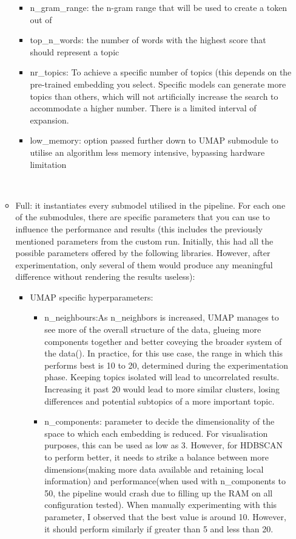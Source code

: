 \documentclass[12pt,MSc,a4paper,oneside]{muthesis}
\begin{document}
\begin{itemize}
\begin{itemize}
        \begin{itemize}
          \item n\_gram\_range: the n-gram range that will be used to create a token out of
          \item top\_n\_words: the number of words with the highest score that should represent a topic
          \item nr\_topics: To achieve a specific number of topics (this depends on the pre-trained embedding you select. Specific models can generate more topics than others, which will not artificially increase the search to accommodate a higher number. There is a limited interval of expansion.
            \item low\_memory: option passed further down to UMAP submodule to utilise an algorithm less memory intensive, bypassing hardware limitation
          \end{itemize}\\
        \item Full: it instantiates every submodel utilised in the pipeline. For each one of the submodules, there are specific parameters that you can use to influence the performance and results (this includes the previously mentioned parameters from the custom run. Initially, this had all the possible parameters offered by the following libraries. However, after experimentation, only several of them would produce any meaningful difference without rendering the results useless):
          \begin{itemize}
            \item UMAP specific hyperparameters:
              \begin{itemize}
                \item n\_neighbours:As n\_neighbors is increased, UMAP manages to see more of the overall structure of the data, glueing more components together and better coveying the broader system of the data(\cite{umap-parameters}). In practice, for this use case, the range in which this performs best is 10 to 20, determined during the experimentation phase. Keeping topics isolated will lead to uncorrelated results. Increasing it past 20 would lead to more similar clusters, losing differences and potential subtopics of a more important topic.
                \item n\_components: parameter to decide the dimensionality of the space to which each embedding is reduced. For visualisation purposes, this can be used as low as 3. However, for HDBSCAN to perform better, it needs to strike a balance between more dimensions(making more data available and retaining local information) and performance(when used with n\_components to 50, the pipeline would crash due to filling up the RAM on all configuration tested). When manually experimenting with this parameter, I observed that the best value is around 10. However, it should perform similarly if greater than 5 and less than 20.

\end{itemize}
\end{itemize}
\end{itemize}
\end{itemize}
\end{document}
